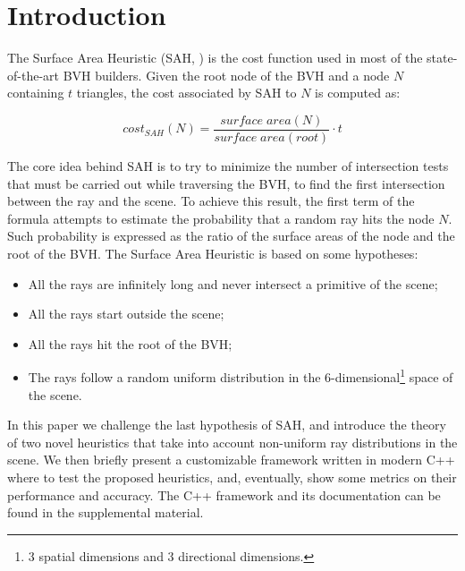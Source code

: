 \documentclass[acmtog, anonymous, review]{acmart}
\begin{document}


\maketitle

\section{Introduction}
The Surface Area Heuristic (SAH, \cite{sah, sah_primer}) is the cost function used in most of the state-of-the-art BVH builders. Given the root node of the BVH and a node $N$ containing $t$ triangles, the cost associated by SAH to $N$ is computed as:

\begin{equation}
  cost_{SAH}(N) = \frac{surface\;area(N)}{surface\;area(root)} \cdot t
  \label{eq:sah}
\end{equation}

The core idea behind SAH is to try to minimize the number of intersection tests that must be carried out while traversing the BVH, to find the first intersection between the ray and the scene. To achieve this result, the first term of the formula attempts to estimate the probability that a random ray hits the node $N$. Such probability is expressed as the ratio of the surface areas of the node and the root of the BVH. The Surface Area Heuristic is based on some hypotheses:

\begin{itemize}
  \item All the rays are infinitely long and never intersect a primitive of the scene;
  \item All the rays start outside the scene;
  \item All the rays hit the root of the BVH;
  \item The rays follow a random uniform distribution in the 6-dimensional\footnote{3 spatial dimensions and 3 directional dimensions.} space of the scene.
\end{itemize}

In this paper we challenge the last hypothesis of SAH, and introduce the theory of two novel heuristics that take into account non-uniform ray distributions in the scene. We then briefly present a customizable framework written in modern C++ where to test the proposed heuristics, and, eventually, show some metrics on their performance and accuracy. The C++ framework and its documentation can be found in the supplemental material.
\end{document}

